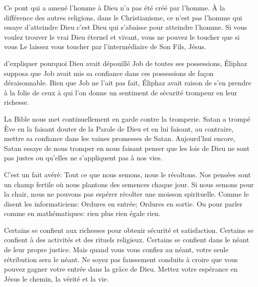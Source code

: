 Ce pont qui a amené l'homme à Dieu n'a pas été créé par l'homme.
 À la différence des autres religions, dans le Christianisme,
 ce n'est pas l'homme qui essaye d'atteindre Dieu
 \ocadr{}c'est Dieu qui s'abaisse pour atteindre l'homme.
 Si vous voulez trouver le vrai Dieu éternel et vivant,
 vous ne pouvez le toucher que si vous Le laissez vous toucher
 par l'intermédiaire de Son Fils, Jésus. 

\dvrule






 d'expliquer pourquoi Dieu avait dépouillé Job
 de toutes ses possessions, Éliphaz supposa que Job avait mis sa confiance
 dans ces possessions de façon déraisonnable.
 Bien que Job ne l'ait pas fait, Éliphaz avait raison de s'en prendre
 à la folie de ceux à qui l'on donne un sentiment de sécurité trompeur
 en leur richesse. 

La Bible nous met continuellement en garde contre la tromperie.
 Satan a trompé Ève en la faisant douter de la Parole de Dieu
 et en lui faisant, au contraire, mettre sa confiance dans les vaines
 promesses de Satan.
 Aujourd'hui encore, Satan essaye de nous tromper en nous faisant penser
 que les lois de Dieu ne sont pas justes ou qu'elles ne s'appliquent
 pas à nos vies. 


C'est un fait avéré\space: Tout ce que nous semons, nous le récoltons.
 Nos pensées sont un champ fertile où nous plantons des semences chaque jour.
 Si nous semons pour la chair, nous ne pouvons pas espérer récolter
 une moisson spirituelle.
 Comme le disent les informaticiens\space:
 \og Ordures en entrée\thinspace; Ordures en sortie. \fg{}
 Ou pour parler comme en mathématiques\space: rien plus rien égale rien. 

Certains se confient aux richesses pour obtenir sécurité et satisfaction.
 Certains se confient à des activités et des rituels religieux.
 Certains se confient dans le néant de leur propre justice.
 Mais quand vous vous confiez au néant, votre seule rétribution sera le néant.
 Ne soyez pas faussement conduits à croire que vous pouvez gagner
 votre entrée dans la grâce de Dieu.
 Mettez votre espérance en Jésus \ocadr{}le chemin, la vérité et la vie.


